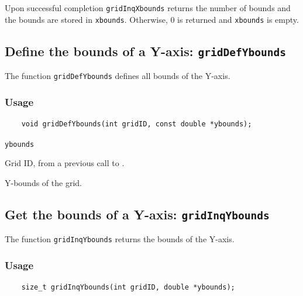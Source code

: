 Upon successful completion {\texttt{gridInqXbounds}} returns the number of bounds and
the bounds are stored in {\texttt{xbounds}}.
Otherwise, 0 is returned and {\texttt{xbounds}} is empty.



\subsection{Define the bounds of a Y-axis: \texttt{gridDefYbounds}}
\label{gridDefYbounds}

The function {\texttt{gridDefYbounds}} defines all bounds of the Y-axis.

\subsubsection*{Usage}

\begin{verbatim}
    void gridDefYbounds(int gridID, const double *ybounds);
\end{verbatim}

\hspace*{4mm}\begin{minipage}[]{15cm}
\begin{deflist}{\texttt{ybounds}\ }
\item[\texttt{gridID}]
Grid ID, from a previous call to {}.
\item[\texttt{ybounds}]
Y-bounds of the grid.

\end{deflist}
\end{minipage}


\subsection{Get the bounds of a Y-axis: \texttt{gridInqYbounds}}
\label{gridInqYbounds}

The function {\texttt{gridInqYbounds}} returns the bounds of the Y-axis.

\subsubsection*{Usage}

\begin{verbatim}
    size_t gridInqYbounds(int gridID, double *ybounds);
\end{verbatim}

